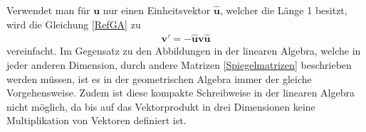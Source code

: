 Verwendet man für $\mathbf{u}$ nur einen Einheitsvektor $\mathbf{\hat{u}}$, welcher die Länge 1 besitzt, wird die Gleichung \eqref{RefGA} zu
\begin{align}
\mathbf{v'} = -\mathbf{\hat{u}v\hat{u}}
\end{align}
vereinfacht. Im Gegensatz zu den Abbildungen in der linearen Algebra, welche in jeder anderen Dimension, durch andere Matrizen \eqref{Spiegelmatrizen} beschrieben werden müssen, ist es in der geometrischen Algebra immer der gleiche Vorgehensweise. Zudem ist diese kompakte Schreibweise in der linearen Algebra nicht möglich, da bis auf das Vektorprodukt in drei Dimensionen keine Multiplikation von Vektoren definiert ist. 